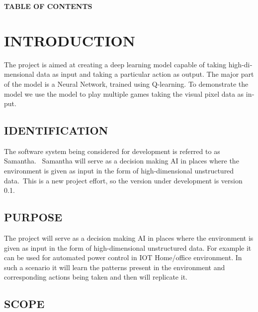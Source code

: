 \documentclass[twoside,letterpaper]{article}
\begin{document}
{\centering{}\bfseries\color{black}
TABLE OF CONTENTS
\par}


\bigskip

\setcounter{tocdepth}{9}
\renewcommand\contentsname{}
\tableofcontents

\bigskip
\flushleft
\clearpage\clearpage\setcounter{page}{1}
\section[INTRODUCTION]{\rmfamily\bfseries\color{black}
INTRODUCTION}
{\color{black}
\foreignlanguage{english}{{The project is aimed at creating a deep learning model capable of taking high-dimensional data as input and taking a particular action as output. The major part of the model is a Neural Network, trained using Q-learning. To demonstrate the model we use the model to play multiple games taking the visual pixel data as input.}}\foreignlanguage{english}{ \ }}

\subsection[IDENTIFICATION]{\rmfamily\bfseries\color{black}
IDENTIFICATION}
{\color{black}
The software system being considered for development is referred to as Samantha. \ Samantha will serve as a decision making AI in places where the environment is given as input in the form of high-dimensional unstructured data.\ This is a new project effort, so the
version under development is version 0.1.}

\subsection[PURPOSE]{\rmfamily\bfseries\color{black}
PURPOSE}
{\color{black}
The project will serve as a decision making AI in places where the environment is given as input in the form of high-dimensional unstructured data. For example it can be used for automated power control in IOT Home/office environment. In such a scenario it will learn the patterns present in the environment and corresponding actions being taken and then will replicate it.}

\subsection[SCOPE]{\rmfamily\bfseries\color{black}
SCOPE}
\end{document}
